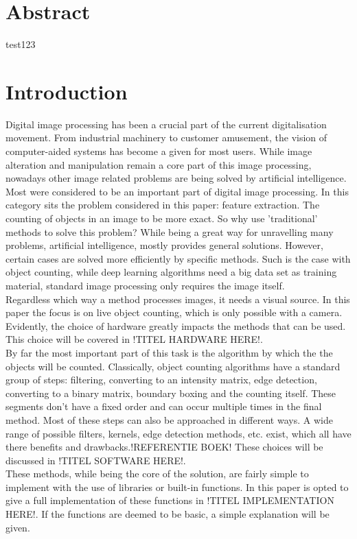 \documentclass[11pt]{article}
\begin{document}


\section*{Abstract}
\thispagestyle{empty}

test123 \cite{einstein}

\newpage
\tableofcontents
\thispagestyle{empty}

\newpage
\listoftables
\thispagestyle{empty}

\newpage
\listoffigures
\thispagestyle{empty}

\newpage
\section{Introduction}

Digital image processing has been a crucial part of the current digitalisation movement. From industrial machinery to customer amusement, the vision of computer-aided systems has become a given for most users. While image alteration and manipulation remain a core part of this image processing, nowadays other image related problems are being solved by artificial intelligence. Most were considered to be an important part of digital image processing. In this category sits the problem considered in this paper: feature extraction. The counting of objects in an image to be more exact. So why use 'traditional' methods to solve this problem? While being a great way for unravelling many problems, artificial intelligence, mostly provides general solutions. However, certain cases are solved more efficiently by specific methods. Such is the case with object counting, while deep learning algorithms need a big data set as training material, standard image processing only requires the image itself.\\

Regardless which way a method processes images, it needs a visual source. In this paper the focus is on live object counting, which is only possible with a camera. Evidently, the choice of hardware greatly impacts the methods that can be used. This choice will be covered in !TITEL HARDWARE HERE!.\\ 
By far the most important part of this task is the algorithm by which the the objects will be counted. Classically, object counting algorithms have a standard group of steps: filtering, converting to an intensity matrix, edge detection, converting to a binary matrix, boundary boxing and the counting itself. These segments don't have a fixed order and can occur multiple times in the final method. Most of these steps can also be approached in different ways. A wide range of possible filters, kernels, edge detection methods, etc. exist, which all have there benefits and drawbacks.!REFERENTIE BOEK! These choices will be discussed in !TITEL SOFTWARE HERE!.\\
These methods, while being the core of the solution, are fairly simple to implement with the use of libraries or built-in functions. In this paper is opted to give a full implementation of these functions in !TITEL IMPLEMENTATION HERE!. If the functions are deemed to be basic, a simple explanation will be given.
\end{document}

